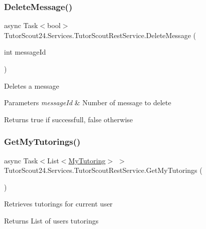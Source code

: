 \subsubsection{\texorpdfstring{Delete\+Message()}{DeleteMessage()}}
{\footnotesize\ttfamily async Task$<$bool$>$ Tutor\+Scout24.\+Services.\+Tutor\+Scout\+Rest\+Service.\+Delete\+Message (\begin{DoxyParamCaption}\item[{int}]{message\+Id }\end{DoxyParamCaption})\hspace{0.3cm}{\ttfamily [inline]}}



Deletes a message 


\begin{DoxyParams}{Parameters}
{\em message\+Id} & Number of message to delete\\
\hline
\end{DoxyParams}
\begin{DoxyReturn}{Returns}
true if successfull, false otherwise
\end{DoxyReturn}
\mbox{\label{class_tutor_scout24_1_1_services_1_1_tutor_scout_rest_service_a5171b947d8edb9279062e9af1f32e41f}} 
\subsubsection{\texorpdfstring{Get\+My\+Tutorings()}{GetMyTutorings()}}
{\footnotesize\ttfamily async Task$<$List$<$\mbox{\hyperlink{class_tutor_scout24_1_1_models_1_1_tutorings_1_1_my_tutoring}{My\+Tutoring}}$>$ $>$ Tutor\+Scout24.\+Services.\+Tutor\+Scout\+Rest\+Service.\+Get\+My\+Tutorings (\begin{DoxyParamCaption}{ }\end{DoxyParamCaption})\hspace{0.3cm}{\ttfamily [inline]}}



Retrieves tutorings for current user 

\begin{DoxyReturn}{Returns}
List of user\textquotesingle{}s tutorings
\end{DoxyReturn}
\mbox{\label{class_tutor_scout24_1_1_services_1_1_tutor_scout_rest_service_a4a4407306592193566c761cb66332bb5}} 
